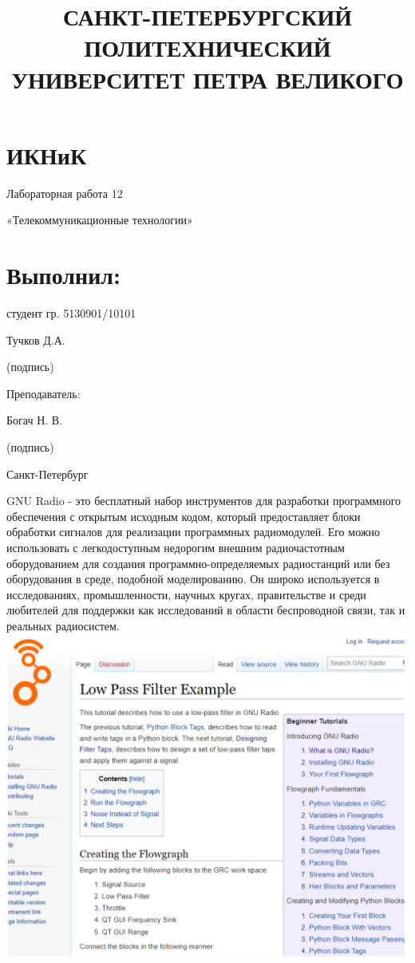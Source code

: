\documentclass[10pt]{article}
\title{САНКТ-ПЕТЕРБУРГСКИЙ ПОЛИТЕХНИЧЕСКИЙ УНИВЕРСИТЕТ ПЕТРА ВЕЛИКОГО }
\author{}
\date{}
\begin{document}
\maketitle
\section*{ИКНиК}
Лабораторная работа 12

«Телекоммуникационные технологии»

\section*{Выполнил:}
студент гр. 5130901/10101

Тучков Д.А.

(подпись)

Преподаватель:

Богач Н. В.

(подпись)

Санкт-Петербург

GNU Radio - это бесплатный набор инструментов для разработки программного обеспечения с открытым исходным кодом, который предоставляет блоки обработки сигналов для реализации программных радиомодулей. Его можно использовать с легкодоступным недорогим внешним радиочастотным оборудованием для создания программно-определяемых радиостанций или без оборудования в среде, подобной моделированию. Он широко используется в исследованиях, промышленности, научных кругах, правительстве и среди любителей для поддержки как исследований в области беспроводной связи, так и реальных радиосистем.\\
\includegraphics[max width=\textwidth, center]{motoda}
\end{document}
